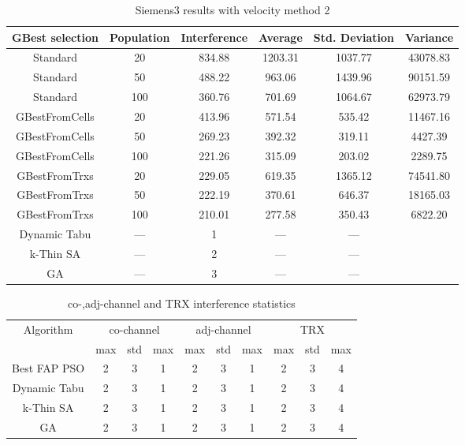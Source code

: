 \begin{table}[H]
\centering
	\begin{tabular}{cccccc}
	\toprule
    GBest selection & Population & Interference & Average & Std. Deviation & Variance \\
    \midrule
    Standard & 20 & 834.88 & 1203.31 & 1037.77 & 43078.83\\
    Standard & 50 & 488.22 & 963.06 & 1439.96 & 90151.59\\
    Standard & 100 & 360.76 & 701.69 & 1064.67 & 62973.79\\
    GBestFromCells & 20 & 413.96 & 571.54 & 535.42 & 11467.16\\
    GBestFromCells & 50 & 269.23 & 392.32 & 319.11 & 4427.39\\
    GBestFromCells & 100 & 221.26 & 315.09 & 203.02 & 2289.75\\
    GBestFromTrxs & 20 & 229.05 & 619.35 & 1365.12 & 74541.80\\
    GBestFromTrxs & 50 & 222.19 & 370.61 & 646.37 & 18165.03\\
    GBestFromTrxs & 100 & 210.01 & 277.58 & 350.43 & 6822.20\\
    Dynamic Tabu & --- & 1 & --- & --- \\
    k-Thin SA & --- & 2 & --- & --- \\
    GA & --- & 3 & --- & --- \\
    \bottomrule
	\end{tabular}
\caption{Siemens3 results with velocity method 2}
\label{tab:siem2m2}
\end{table}
\begin{table}[H]
\centering
	\begin{tabular}{cccccccccc}
	\toprule
    Algorithm & \multicolumn{3}{c}{co-channel} & \multicolumn{3}{c}{adj-channel} & \multicolumn{3}{c}{TRX}\\
              & max & std & max
              & max & std & max
              & max & std & max\\
    \midrule
    Best FAP PSO & 2 & 3 & 1 & 2 & 3 & 1 & 2 & 3 & 4\\ \hline
    Dynamic Tabu & 2 & 3 & 1 & 2 & 3 & 1 & 2 & 3 & 4\\\hline
    k-Thin SA & 2 & 3 & 1 & 2 & 3 & 1 & 2 & 3 & 4\\\hline
    GA & 2 & 3 & 1 & 2 & 3 & 1 & 2 & 3 & 4\\\hline
    \bottomrule
	\end{tabular}
\caption{co-,adj-channel and TRX interference statistics}
\label{tab:stats-siem2m1}
\end{table}
